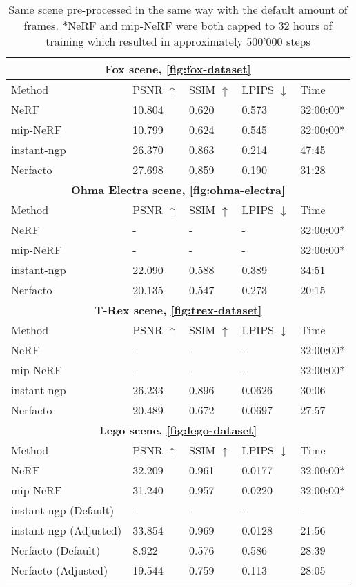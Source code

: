 \begin{table}[h]
\centering
\begin{tabular}{|l|llll|}
\hline
\multicolumn{5}{|c|}{\textbf{Fox scene, \autoref{fig:fox-dataset}}} \\ 
\hline
Method  & PSNR $\uparrow$ & SSIM $\uparrow$ & LPIPS $\downarrow$& Time  \\ 
\hline
NeRF        & 10.804    & 0.620     & 0.573    & 32:00:00*   \\
mip-NeRF    & 10.799    & 0.624     & 0.545    & 32:00:00*    \\
instant-ngp & 26.370    & 0.863     & 0.214    & 47:45    \\
Nerfacto    & 27.698    & 0.859     & 0.190    & 31:28    \\
\hline
\hline
\multicolumn{5}{|c|}{\textbf{Ohma Electra scene, \autoref{fig:ohma-electra}}} \\ 
\hline
Method  & PSNR $\uparrow$ & SSIM $\uparrow$ & LPIPS $\downarrow$& Time  \\ 
\hline
NeRF        & -    & -     & -    & 32:00:00*    \\
mip-NeRF    & -    & -     & -    & 32:00:00*    \\
instant-ngp & 22.090    & 0.588     & 0.389    & 34:51    \\
Nerfacto    & 20.135    & 0.547     & 0.273    & 20:15    \\ 
\hline
\hline
\multicolumn{5}{|c|}{\textbf{T-Rex scene, \autoref{fig:trex-dataset}}} \\ 
\hline
Method  & PSNR $\uparrow$ & SSIM $\uparrow$ & LPIPS $\downarrow$& Time  \\ 
\hline
NeRF        & -    & -     & -    & 32:00:00*    \\
mip-NeRF    & -    & -     & -    & 32:00:00*    \\
instant-ngp    & 26.233    & 0.896     & 0.0626    & 30:06    \\
Nerfacto    & 20.489    & 0.672     & 0.0697    & 27:57    \\ 
\hline
\hline
\multicolumn{5}{|c|}{\textbf{Lego scene, \autoref{fig:lego-dataset}}} \\ 
\hline
Method  & PSNR $\uparrow$ & SSIM $\uparrow$ & LPIPS $\downarrow$& Time  \\ 
\hline
NeRF        & 32.209    & 0.961     & 0.0177    & 32:00:00*    \\
mip-NeRF    & 31.240    & 0.957     & 0.0220    & 32:00:00*    \\
instant-ngp (Default)     & -    & -     & -    & -    \\
instant-ngp (Adjusted)     & 33.854    & 0.969     & 0.0128    & 21:56    \\
Nerfacto (Default)    & 8.922    & 0.576     & 0.586    & 28:39    \\ 
Nerfacto (Adjusted)    & 19.544    & 0.759     & 0.113    & 28:05    \\ 
\hline
\end{tabular}
\caption{Same scene pre-processed in the same way with the default amount of frames. $\ast$NeRF and mip-NeRF were both capped to 32 hours of training which resulted in approximately 500'000 steps}
\label{tab:method-comparison}
\end{table}